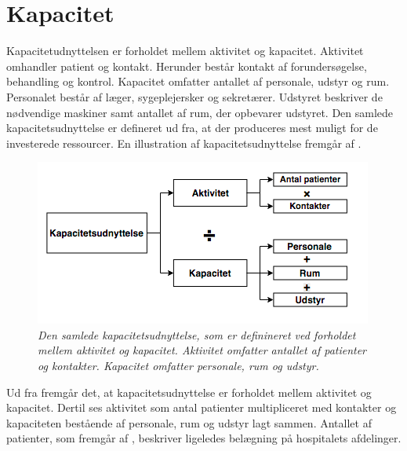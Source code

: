 \section{Kapacitet} \label{kap}
Kapacitetudnyttelsen er forholdet mellem aktivitet og kapacitet. Aktivitet omhandler patient og kontakt. Herunder består kontakt af forundersøgelse, behandling og kontrol. Kapacitet omfatter antallet af personale, udstyr og rum. Personalet består af læger, sygeplejersker og sekretærer. Udstyret beskriver de nødvendige maskiner samt antallet af rum, der opbevarer udstyret. Den samlede kapacitetsudnyttelse er defineret ud fra, at der produceres mest muligt for de investerede ressourcer.\cite{Company2013} En illustration af kapacitetsudnyttelse fremgår af .

\begin{figure}[H]
	\flushleft 
	\centering
	\includegraphics[scale=0.6]{figures/Kapacitetsudnyttelse.png}
	\flushleft
	\caption{\textit{Den samlede kapacitetsudnyttelse, som er definineret ved forholdet mellem aktivitet og kapacitet. Aktivitet omfatter antallet af patienter og kontakter. Kapacitet omfatter personale, rum og udstyr.\cite{Company2013}}}
	\label{kapacitet}
\end{figure}

\noindent
Ud fra  fremgår det, at kapacitetsudnyttelse er forholdet mellem aktivitet  og kapacitet. Dertil ses aktivitet som antal patienter multipliceret med kontakter og kapaciteten bestående af personale, rum og udstyr lagt sammen. Antallet af patienter, som fremgår af , beskriver ligeledes belægning på hospitalets afdelinger. \cite{Company2013} 

